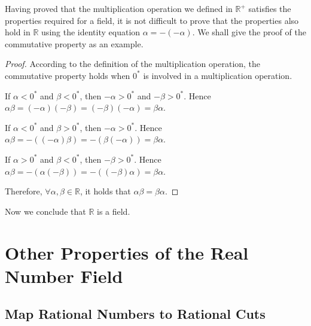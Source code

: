 \documentclass[onecolumn]{article}
\begin{document}
Having proved that the multiplication operation we defined in $\mathbb{R^+}$ 
satisfies the properties required for a field, it is not difficult to prove that 
the properties also hold in $\mathbb{R}$ using the identity equation 
$\alpha = -(-\alpha)$. We shall give the proof of the commutative property as an 
example.
\begin{proof}
  According to the definition of the multiplication operation, the commutative 
  property holds when $0^*$ is involved in a multiplication operation.

  If $\alpha < 0^*$ and $\beta < 0^*$, then $-\alpha > 0^*$ and $-\beta > 0^*$. 
  Hence $\alpha \beta = (-\alpha)(-\beta) = (-\beta)(-\alpha) = \beta \alpha$.

  If $\alpha < 0^*$ and $\beta > 0^*$, then $-\alpha > 0^*$. Hence 
  $\alpha \beta = -((-\alpha)\beta) = -(\beta(-\alpha)) = \beta \alpha$.

  If $\alpha > 0^*$ and $\beta < 0^*$, then $-\beta > 0^*$. Hence 
  $\alpha \beta = -(\alpha(-\beta)) = -((-\beta)\alpha) = \beta \alpha$.

  Therefore, $\forall \alpha, \beta \in \mathbb{R}$, it holds that 
  $\alpha\beta = \beta\alpha$.
\end{proof}

Now we conclude that $\mathbb{R}$ is a field.

\section{Other Properties of the Real Number Field}

\subsection{Map Rational Numbers to Rational Cuts}
\end{document}
